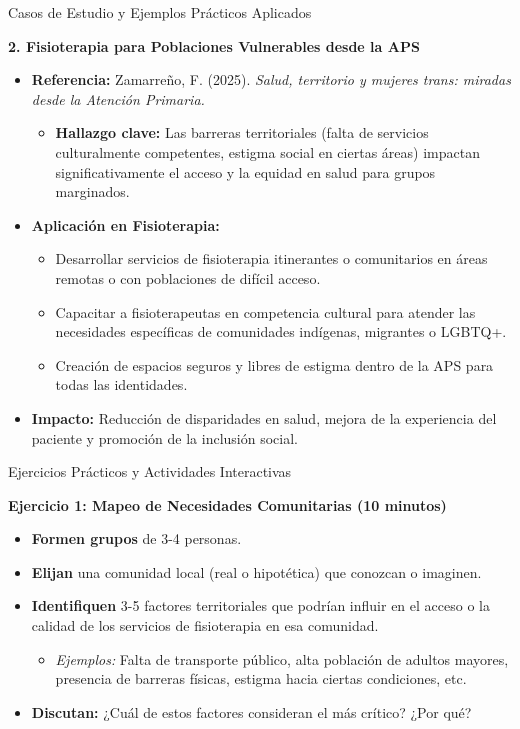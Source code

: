 \documentclass[aspectratio=169]{beamer}
\begin{document}
\begin{frame}{Casos de Estudio y Ejemplos Prácticos Aplicados}


\textbf{2. Fisioterapia para Poblaciones Vulnerables desde la APS}
\begin{itemize}
  \item \textbf{Referencia:} Zamarreño, F. (2025). \textit{Salud, territorio y mujeres trans: miradas desde la Atención Primaria.}
  \begin{itemize}
    \item \textbf{Hallazgo clave:} Las barreras territoriales (falta de servicios culturalmente competentes, estigma social en ciertas áreas) impactan significativamente el acceso y la equidad en salud para grupos marginados.
  \end{itemize}
  \item \textbf{Aplicación en Fisioterapia:}
  \begin{itemize}
    \item Desarrollar servicios de fisioterapia itinerantes o comunitarios en áreas remotas o con poblaciones de difícil acceso.
    \item Capacitar a fisioterapeutas en competencia cultural para atender las necesidades específicas de comunidades indígenas, migrantes o LGBTQ+.
    \item Creación de espacios seguros y libres de estigma dentro de la APS para todas las identidades.
  \end{itemize}
  \item \textbf{Impacto:} Reducción de disparidades en salud, mejora de la experiencia del paciente y promoción de la inclusión social.
\end{itemize}
\end{frame}

\begin{frame}{Ejercicios Prácticos y Actividades Interactivas}


\textbf{Ejercicio 1: Mapeo de Necesidades Comunitarias (10 minutos)}
\begin{itemize}
  \item \textbf{Formen grupos} de 3-4 personas.
  \item \textbf{Elijan} una comunidad local (real o hipotética) que conozcan o imaginen.
  \item \textbf{Identifiquen} 3-5 factores territoriales que podrían influir en el acceso o la calidad de los servicios de fisioterapia en esa comunidad.
  \begin{itemize}
    \item \textit{Ejemplos:} Falta de transporte público, alta población de adultos mayores, presencia de barreras físicas, estigma hacia ciertas condiciones, etc.
  \end{itemize}
  \item \textbf{Discutan:} ¿Cuál de estos factores consideran el más crítico? ¿Por qué?
\end{itemize}
\end{frame}
\end{document}
